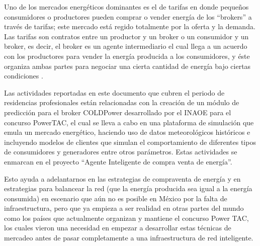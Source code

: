 Uno de los mercados energéticos dominantes es el de tarifas en donde pequeños consumidores o productores pueden comprar o vender energía de los ``brokers'' a través de tarifas; este mercado está regido totalmente por la oferta y la demanda.
Las tarifas son contratos entre un productor y un broker o un consumidor y un broker, es decir, el broker es un agente intermediario el cual llega a un acuerdo con los productores para vender la energía producida a los consumidores, y éste organiza ambas partes para negociar una cierta cantidad de energía bajo ciertas condiciones \cite{MPAlonsoAYRGonzalezDesarrolloDeTec}.

Las actividades reportadas en este documento que cubren el periodo de residencias profesionales están relacionadas con la creación de un módulo de predicción para el broker COLDPower desarrollado por el INAOE para el concurso PowerTAC, el cual se lleva a cabo en una plataforma de simulación que emula un mercado energético, haciendo uso de datos meteorológicos históricos e incluyendo modelos de clientes que simulan el comportamiento de diferentes tipos de consumidores y generadores entre otros parámetros. 
Estas actividades se enmarcan en el proyecto ``Agente Inteligente de compra venta de energía''.

Esto ayuda a adelantarnos en las estrategias de compraventa de energía y en estrategias para balancear la red (que la energía producida sea igual a la energía consumida) en escenario que aún no es posible en México por la falta de infraestructura, pero que ya empieza a ser realidad en otras partes del mundo como los países que actualmente organizan y mantiene el concurso Power TAC, los cuales vieron una necesidad en empezar a desarrollar estas técnicas de mercadeo antes de pasar completamente a una infraestructura de red inteligente.